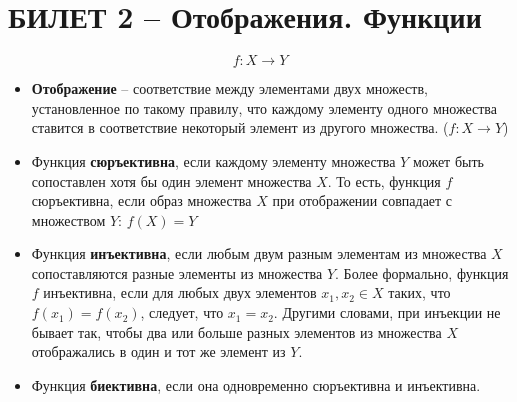 \documentclass{article}
\begin{document}
\section{БИЛЕТ 2 -- Отображения. Функции}
$$f: X \to Y $$
\begin{itemize}
\item \textbf{Отображение} -- соответствие между элементами двух множеств, установленное по такому правилу, что каждому элементу одного множества ставится в соответствие некоторый элемент из другого множества. ($f: X \to Y $)
\item Функция \textbf{сюръективна}, если каждому элементу множества $Y$ может быть сопоставлен хотя бы один элемент множества $X$. То есть, функция $f$ сюръективна, если образ множества $X$ при отображении совпадает с множеством $Y$: $f(X)=Y$
\item Функция \textbf{инъективна}, если любым двум разным элементам из множества $X$ сопоставляются разные элементы из множества $Y$. Более формально, функция $f$ инъективна, если для любых двух элементов $x_{1}, x_{2} \in X$ таких, что $f(x_{1}) = f(x_{2})$, следует, что $x_{1}=x_{2}$. Другими словами, при инъекции не бывает так, чтобы два или больше разных элементов из множества $X$ отображались в один и тот же элемент из $Y$.
\item Функция \textbf{биективна}, если она одновременно сюръективна и инъективна.
\end{itemize}
\newpage
\end{document}
